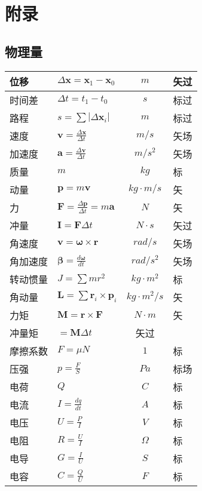 \section{附录}
\subsection{物理量}
\begin{tabular}{l|l|c|l}
\hline
位移 & $\Delta\bm{x}=\bm{x}_1-\bm{x}_0$ & $m$ & 矢过 \\ \hline
时间差 & $\Delta t=t_1-t_0$ & $s$ & 标过 \\ \hline
路程 & $s=\sum |\Delta \bm{x}_i| $ & $m$ & 标过 \\ \hline
速度 & $\bm{v}=\frac{\Delta\bm{x}}{\Delta t}$ & $m/s$ & 矢场 \\ \hline
加速度 & $\bm{a}=\frac{\Delta\bm{v}}{\Delta t}$ & $m/s^2$ & 矢场 \\ \hline
质量 & $m$ & $kg$ & 标 \\ \hline
动量 & $\bm{p}=m\bm{v}$ & $kg\cdot m/s$ & 矢 \\ \hline
力 & $\bm{F}=\frac{\Delta \bm{p}}{\Delta t}=m\bm{a}$ & $N$ & 矢 \\ \hline
冲量 & $\bm{I}=\bm{F}\Delta t$ & $N\cdot s$ & 矢过 \\ \hline
角速度 & $\bm{v}=\bm{\omega} \times \bm{r}$ & $rad/s$ & 矢场 \\ \hline
角加速度 & $\bm{\beta}=\frac{d\bm{\omega}}{dt}$ & $rad/s^2$ & 矢场 \\ \hline
转动惯量 & $J=\sum mr^2$ & $kg\cdot m^2$ & 标 \\ \hline
角动量 & $\bm{L}=\sum \bm{r}_i\times \bm{p}_i$ & $kg\cdot m^2/s$ & 矢 \\ \hline
力矩 & $\bm{M}=\bm{r}\times \bm{F}$ & $N\cdot m$ & 矢 \\ \hline
冲量矩 & $=\bm{M}\Delta t$ & 矢过 \\ \hline
摩擦系数 & $F=\mu N$ & $1$ & 标 \\ \hline
压强 & $p=\frac{F}{S}$ & $Pa$ & 标场 \\ \hline
电荷 & $Q$               & $C$ & 标 \\ \hline
电流 & $I=\frac{dq}{dt}$ & $A$ & 标 \\ \hline
电压 & $U=\frac{P}{I}$ & $V$ & 标 \\ \hline
电阻 & $R=\frac{U}{I}$ & $\Omega$ & 标 \\ \hline
电导 & $G=\frac{I}{U}$ & $S$ & 标 \\ \hline
电容 & $C=\frac{Q}{U}$ & $F$ & 标 \\ \hline

\end{tabular}
